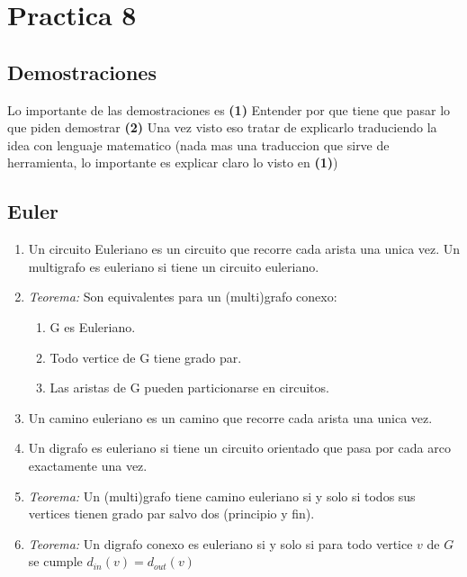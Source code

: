 \section{Practica 8}
\subsection{Demostraciones}
Lo importante de las demostraciones es \textbf{(1)} Entender por que tiene que pasar lo que piden demostrar \textbf{(2)} Una vez visto eso tratar de explicarlo traduciendo la idea con lenguaje matematico (nada mas una traduccion que sirve de herramienta, lo importante es explicar claro lo visto en \textbf{(1)})

\subsection{Euler}
\begin{enumerate}
\item Un circuito Euleriano es un circuito que recorre cada arista una unica vez. Un multigrafo es euleriano si tiene un circuito euleriano.
\item \textit{Teorema:} Son equivalentes para un (multi)grafo conexo:
   \begin{enumerate}
   \item G es Euleriano.
   \item Todo vertice de G tiene grado par.
   \item Las aristas de G pueden particionarse en circuitos.
   \end{enumerate}
\item Un camino euleriano es un camino que recorre cada arista una unica vez.
\item Un digrafo es euleriano si tiene un circuito orientado que pasa por cada arco exactamente una vez.
\item \textit{Teorema:} Un (multi)grafo tiene camino euleriano si y solo si todos sus vertices tienen grado par salvo dos (principio y fin).
\item \textit{Teorema:} Un digrafo conexo es euleriano si y solo si para todo vertice $v$ de $G$ se cumple $d_{in}(v) = d_{out}(v)$
\end{enumerate}

